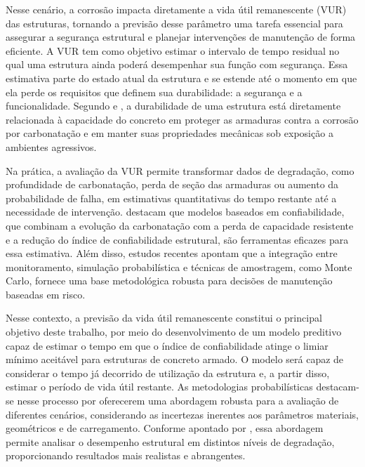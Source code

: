 Nesse cenário, a corrosão impacta diretamente a vida útil remanescente (VUR) das estruturas, tornando a previsão desse parâmetro uma tarefa essencial para assegurar a segurança estrutural e planejar intervenções de manutenção de forma eficiente. A VUR tem como objetivo estimar o intervalo de tempo residual no qual uma estrutura ainda poderá desempenhar sua função com segurança. Essa estimativa parte do estado atual da estrutura e se estende até o momento em que ela perde os requisitos que definem sua durabilidade: a segurança e a funcionalidade. Segundo \textcite{bertolini_corrosion_2013} e \textcite{mehta_concrete_2014}, a durabilidade de uma estrutura está diretamente relacionada à capacidade do concreto em proteger as armaduras contra a corrosão por carbonatação e em manter suas propriedades mecânicas sob exposição a ambientes agressivos.

Na prática, a avaliação da VUR permite transformar dados de degradação, como profundidade de carbonatação, perda de seção das armaduras ou aumento da probabilidade de falha, em estimativas quantitativas do tempo restante até a necessidade de intervenção. \textcite{bertolini_corrosion_2013, okoh_overview_2014} destacam que modelos baseados em confiabilidade, que combinam a evolução da carbonatação com a perda de capacidade resistente e a redução do índice de confiabilidade estrutural, são ferramentas eficazes para essa estimativa. Além disso, estudos recentes \cite{silva_statistical_2016, zhang_prediction_2018} apontam que a integração entre monitoramento, simulação probabilística e técnicas de amostragem, como Monte Carlo, fornece uma base metodológica robusta para decisões de manutenção baseadas em risco. 

Nesse contexto, a previsão da vida útil remanescente constitui o principal objetivo deste trabalho, por meio do desenvolvimento de um modelo preditivo capaz de estimar o tempo em que o índice de confiabilidade atinge o limiar mínimo aceitável para estruturas de concreto armado. O modelo será capaz de considerar o tempo já decorrido de utilização da estrutura e, a partir disso, estimar o período de vida útil restante. As metodologias probabilísticas destacam-se nesse processo por oferecerem uma abordagem robusta para a avaliação de diferentes cenários, considerando as incertezas inerentes aos parâmetros materiais, geométricos e de carregamento. Conforme apontado por \textcite{pereira_junior_reliability_2023}, essa abordagem permite analisar o desempenho estrutural em distintos níveis de degradação, proporcionando resultados mais realistas e abrangentes.

